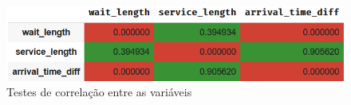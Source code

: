 \begin{figure}[H]
    \includegraphics{analise-de-dados/anual/spearman-test.png}
    \caption{Testes de correlação entre as variáveis}
    \label{fig: spearman-test-1}
\end{figure}


